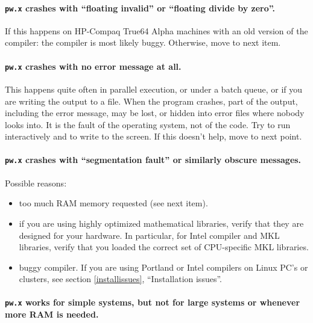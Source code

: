 \documentclass[12pt,a4paper]{article}
\begin{document}
\paragraph{\texttt{pw.x} crashes with ``floating invalid'' or ``floating divide by zero''.}

If this happens on HP-Compaq True64 Alpha machines with an old
version of the compiler: the compiler is most likely buggy.
Otherwise, move to next item.

\paragraph{\texttt{pw.x} crashes with no error message at all.}

This happens quite often in parallel execution, or under a batch
queue, or if you are writing the output to a file.
When the program crashes, part of the output, including the error
message, may be lost, or hidden into error files where nobody looks
into.
It is the fault of the operating system, not of the code.
Try to run interactively and to write to the screen.
If this doesn't help, move to next point.

\paragraph{\texttt{pw.x} crashes with ``segmentation fault'' or
           similarly obscure messages.}

Possible reasons:
\begin{itemize}
  \item
    too much RAM memory requested (see next item).
  \item
    if you are using highly optimized mathematical libraries, verify
    that they are designed for your hardware.
    In particular, for Intel compiler and MKL libraries, verify that
    you loaded the correct set of CPU-specific MKL libraries.
  \item
    buggy compiler.
    If you are using Portland or Intel compilers on Linux PC's or
    clusters, see section \ref{installissues}, ``Installation
    issues''.
\end{itemize}

\paragraph{\texttt{pw.x} works for simple systems, but not for large
           systems or whenever more RAM is needed.}
\end{document}
